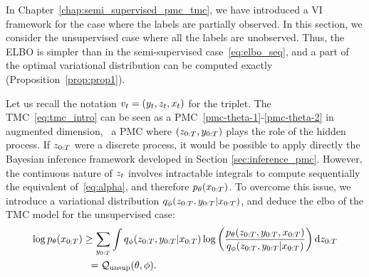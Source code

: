 In Chapter~\ref{chap:semi_supervised_pmc_tmc}, 
we have introduced a VI framework for the case where the labels are partially observed.
In this section, we consider the unsupervised case where all the labels are unobserved.
Thus, the ELBO is simpler than in the semi-supervised case~\eqref{eq:elbo_seq}, 
and a  part of the optimal variational distribution can be computed 
exactly (Proposition~\ref{prop:prop1}).

Let us recall the notation  ${v}_t=(y_t,z_t,x_t)$  
for the triplet.
The TMC~\eqref{eq:tmc_intro}
can be seen as a PMC~\eqref{pmc-theta-1}-\eqref{pmc-theta-2}
in augmented dimension,
\ie~a PMC where $(z_{0:T},y_{0:T})$ plays 
the role of the hidden process. 
If $z_{0:T}$ were a discrete process, it would be possible to apply 
directly the Bayesian
inference framework developed in Section 
\ref{sec:inference_pmc}.
However, the continuous nature of $z_t$ involves intractable 
integrals to compute sequentially the 
equivalent of~\eqref{eq:alpha},
and therefore $p_{\theta}(x_{0:T})$.
To overcome this issue, we introduce a variational distribution 
$q_\phi(z_{0:T},y_{0:T}|x_{0:T})$, 
 and  deduce the \gls*{elbo} of the TMC model for the unsupervised case:
 \begin{align*}
 \log p_{\theta}(x_{0:T}) & \geq \sum_{y_{0:T}} 
 \int q_\phi(z_{0:T},y_{0:T}|x_{0:T})  
 \log\left(\frac{p_{\theta}(z_{0:T},y_{0:T},x_{0:T}) }
 {q_\phi(z_{0:T},y_{0:T}|x_{0:T})}\right)  {\rm d}z_{0:T} 
\\ & \; \; = \mathcal{Q}_{\mathrm{unsup}}(\theta,\phi) \text{.} 
 \end{align*}

